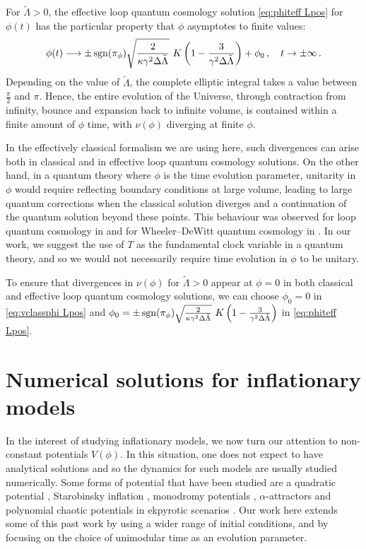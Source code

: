 \documentclass[aps,prd,11pt,showkeys,nofootinbib]{revtex4-2}
\begin{document}
For $\tilde\Lambda>0$, the effective loop quantum cosmology solution \eqref{eq:phiteff Lpos} for $\phi(t)$ has the particular property that $\phi$ asymptotes to finite values:
\begin{equation}
 \phi(t)\longrightarrow \pm\,{\rm sgn}(\pi_\phi)\sqrt{\frac{2}{\kappa\gamma^2\Delta\tilde{\Lambda}}}\ K\left(1-\frac{3}{\gamma^2\Delta\tilde\Lambda}\right)+\phi_0\,, \quad t\rightarrow \pm \infty\,.
\end{equation}
Depending on the value of $\tilde\Lambda$, the complete elliptic integral takes a value between $\frac{\pi}{2}$ and $\pi$. Hence, the entire evolution of the Universe, through contraction from infinity, bounce and expansion back to infinite volume, is contained within a finite amount of $\phi$ time, with $\nu(\phi)$ diverging at finite $\phi$.

In the effectively classical formalism we are using here, such divergences can arise both in classical and in effective loop quantum cosmology solutions. On the other hand, in a quantum theory where $\phi$ is the time evolution parameter, unitarity in $\phi$ would require reflecting boundary conditions at large volume, leading to large quantum corrections when the classical solution diverges and a continuation of the quantum solution beyond these points. This behaviour was observed for loop quantum cosmology in \cite{Pawlowski:2011zf} and for Wheeler--DeWitt quantum cosmology in \cite{Gielen:2021igw}. In our work, we suggest the use of $T$ as the fundamental clock variable in a quantum theory, and so we would not necessarily require time evolution in $\phi$ to be unitary.

To ensure that divergences in $\nu(\phi)$ for $\tilde\Lambda>0$ appear at $\phi=0$ in both classical and effective loop quantum cosmology solutions, we can choose $\phi_0=0$ in \eqref{eq:vclassphi Lpos} and $\phi_0=\pm\,{\rm sgn}(\pi_\phi)\sqrt{\frac{2}{\kappa\gamma^2\Delta\tilde{\Lambda}}}\ K\left(1-\frac{3}{\gamma^2\Delta\tilde\Lambda}\right)$ in \eqref{eq:phiteff Lpos}.

\section{Numerical solutions for inflationary models}
\label{numericalsol}

In the interest of studying inflationary models, we now turn our attention to non-constant potentials $V(\phi)$. In this situation, one does not expect to have analytical solutions and so the dynamics for such models are usually studied numerically. Some forms of potential that have been studied are a quadratic potential \cite{Ashtekar:2011rm,Agullo:2013ai}, Starobinsky inflation \cite{Bonga:2015kaa,Iteanu:2022zha}, monodromy potentials \cite{Sharma:2018vnv}, $\alpha$-attractors \cite{Shahalam:2018rby,Shahalam:2019mpw} and polynomial chaotic potentials in ekpyrotic scenarios \cite{Brown:2025hcb,Frion:2025cyd}. Our work here extends some of this past work by using a wider range of initial conditions, and by focusing on the choice of unimodular time as an evolution parameter.
\end{document}
